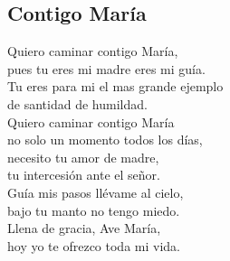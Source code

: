 \subsection{Contigo María}

\begin{center}

{\Large 
Quiero caminar contigo María,\\
pues tu eres mi madre eres mi guía.\\
Tu eres para mi el mas grande ejemplo\\
de santidad de humildad.\\
\vspace{2ex}
Quiero caminar contigo María\\
no solo un momento todos los días,\\
necesito tu amor de madre,\\
tu intercesión ante el señor.\\
\vspace{2ex}
Guía mis pasos llévame al cielo,\\
bajo tu manto no tengo miedo.\\
Llena de gracia, Ave María,\\
hoy yo te ofrezco toda mi vida.\\
}
\end{center}